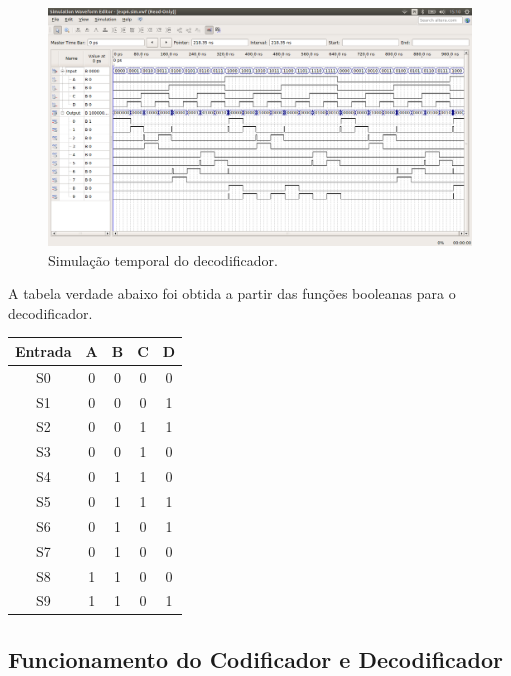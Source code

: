 \documentclass[12pt]{article}
\begin{document}
\begin{figure}[H]
	\centering
	\includegraphics[width=1\textwidth]{timingdecoder.png}
	\caption{Simulação temporal do decodificador.}
	\label{fig:timedecoder}
\end{figure}

A tabela verdade abaixo foi obtida a partir das funções booleanas para o decodificador.

\begin{table}[H]
	\centering
	\begin{tabular}{|c|c|c|c|c|}
		\cline{1-5}
		\multicolumn{1}{|c|}{Entrada} & \multicolumn{1}{|c|}{A} & \multicolumn{1}{|c|}{B} & \multicolumn{1}{|c|}{C} & \multicolumn{1}{|c|}{D}\\
		\hline
		S0 & 0 & 0 & 0 & 0 \\
		\hline
		S1 & 0 & 0 & 0 & 1 \\
		\hline
		S2 & 0 & 0 & 1 & 1 \\
		\hline
		S3 & 0 & 0 & 1 & 0 \\
		\hline
		S4 & 0 & 1 & 1 & 0 \\
		\hline
		S5 & 0 & 1 & 1 & 1 \\
		\hline
		S6 & 0 & 1 & 0 & 1 \\
		\hline
		S7 & 0 & 1 & 0 & 0 \\
		\hline
		S8 & 1 & 1 & 0 & 0 \\
		\hline
		S9 & 1 & 1 & 0 & 1 \\
		\hline
	\end{tabular}
	
\end{table} 




\subsection{Funcionamento do Codificador e Decodificador}
\end{document}
